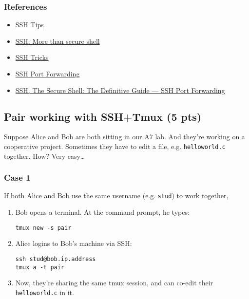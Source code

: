 \documentclass{article} [NO-DEFAULT-PACKAGES] \usepackage{wx672hyperref}
\begin{document}
\subsubsection{References}
\label{sec:org97a7f0e}
\begin{itemize}
\item \href{https://www.grid5000.fr/mediawiki/index.php/SSH\#Tips}{SSH Tips}
\item \href{http://matt.might.net/articles/ssh-hacks/}{SSH: More than secure shell}
\item \href{https://serversforhackers.com/ssh-tricks}{SSH Tricks}
\item \href{http://www.aptivate.org/en/blog/2010/03/10/ssh-port-forwarding/}{SSH Port Forwarding}
\item \href{http://www.onlamp.com/pub/a/onlamp/excerpt/ssh\_11/index3.html}{SSH, The Secure Shell: The Definitive Guide --- SSH Port Forwarding}
\end{itemize}

\subsection{Pair working with SSH+Tmux (5 pts)}
\label{sec:org6951b7e}
Suppose Alice and Bob are both sitting in our A7 lab. And they're working on a
cooperative project. Sometimes they have to edit a file, e.g. \texttt{helloworld.c}
together. How? Very easy\ldots{}
\subsubsection{Case 1}
\label{sec:org4abd9b4}
If both Alice and Bob use the same username (e.g. \texttt{stud}) to work together,
\begin{enumerate}
\item Bob opens a terminal. At the command prompt, he types:
\begin{verbatim}
tmux new -s pair
\end{verbatim}
\item Alice logins to Bob's machine via SSH:
\begin{verbatim}
ssh stud@bob.ip.address
tmux a -t pair
\end{verbatim}
\item Now, they're sharing the same tmux session, and can co-edit their \texttt{helloworld.c} in
it.
\end{enumerate}
\end{document}
